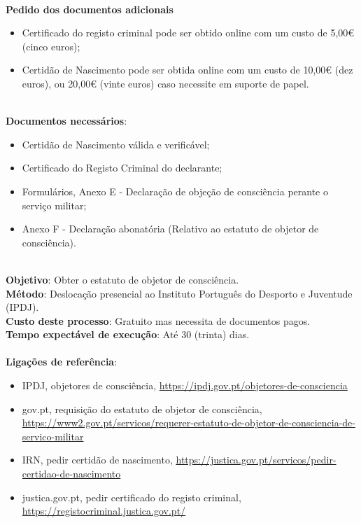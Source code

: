 \newpage
\leavevmode\\
\textbf{Pedido dos documentos adicionais}
\begin{itemize}
	\item Certificado do registo criminal pode ser obtido online com um custo de 5,00€ (cinco euros);
	\item Certidão de Nascimento pode ser obtida online com um custo de 10,00€ (dez euros), ou 20,00€ (vinte euros) caso necessite em suporte de papel.
\end{itemize}
\leavevmode\\
\textbf{Documentos necessários}:
\begin{itemize}
	\item Certidão de Nascimento válida e verificável;
	\item Certificado do Registo Criminal do declarante;
	\item Formulários, Anexo E - Declaração de objeção de consciência perante o serviço militar;
	\item Anexo F - Declaração abonatória (Relativo ao estatuto de objetor de consciência).
\end{itemize}
\leavevmode\\
\textbf{Objetivo}: Obter o estatuto de objetor de consciência. \\
\textbf{Método}: Deslocação presencial ao Instituto Português do Desporto e Juventude (IPDJ). \\
\textbf{Custo deste processo}: Gratuito mas necessita de documentos pagos. \\
\textbf{Tempo expectável de execução}: Até 30 (trinta) dias. \\
\\
\textbf{Ligações de referência}:
\begin{itemize}
	\item IPDJ, objetores de consciência, \url{https://ipdj.gov.pt/objetores-de-consciencia}
	\item gov.pt, requisição do estatuto de objetor de consciência, \url{https://www2.gov.pt/servicos/requerer-estatuto-de-objetor-de-consciencia-de-servico-militar}
	\item IRN, pedir certidão de nascimento, \url{https://justica.gov.pt/servicos/pedir-certidao-de-nascimento}
	\item justica.gov.pt, pedir certificado do registo criminal, \url{https://registocriminal.justica.gov.pt/}
\end{itemize}

\newpage

